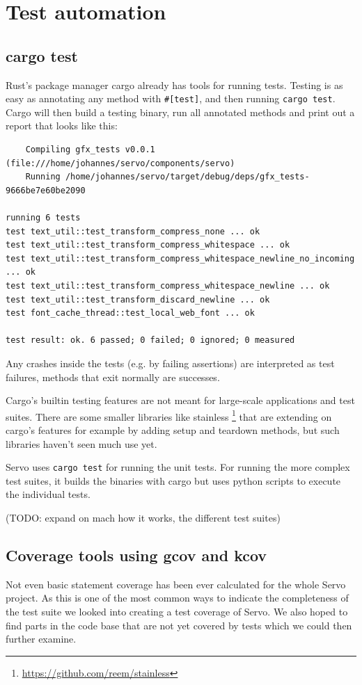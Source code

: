 \documentclass{scrartcl}
\newcommand{\todo}[1] {{\color{red}(TODO: #1)}}
\begin{document}
\section{Test automation}


\subsection{cargo test}

Rust's package manager cargo already has tools for running tests. Testing is as easy as annotating any method with \texttt{\#[test]}, and then running \texttt{cargo test}. Cargo will then build a testing binary, run all annotated methods and print out a report that looks like this:


\begin{verbatim}
    Compiling gfx_tests v0.0.1 (file:///home/johannes/servo/components/servo)
    Running /home/johannes/servo/target/debug/deps/gfx_tests-9666be7e60be2090

running 6 tests
test text_util::test_transform_compress_none ... ok
test text_util::test_transform_compress_whitespace ... ok
test text_util::test_transform_compress_whitespace_newline_no_incoming ... ok
test text_util::test_transform_compress_whitespace_newline ... ok
test text_util::test_transform_discard_newline ... ok
test font_cache_thread::test_local_web_font ... ok

test result: ok. 6 passed; 0 failed; 0 ignored; 0 measured

\end{verbatim}

Any crashes inside the tests (e.g. by failing assertions) are interpreted as test failures, methods that exit normally are successes.

Cargo's builtin testing features are not meant for large-scale applications and test suites. There are some smaller libraries like stainless \footnote{\url{https://github.com/reem/stainless}} that are extending on cargo's features for example by adding setup and teardown methods, but such libraries haven't seen much use yet. 

Servo uses \texttt{cargo test} for running the unit tests. For running the more complex test suites, it builds the binaries with cargo but uses python scripts to execute the individual tests.

\todo{expand on mach how it works, the different test suites}


\subsection{Coverage tools using gcov and kcov}
Not even basic statement coverage has been ever calculated for the whole Servo project. As this is one of the most common ways to indicate the completeness of the test suite we looked into creating a test coverage of Servo. We also hoped to find parts in the code base that are not yet covered by tests which we could then further examine. 
\end{document}
